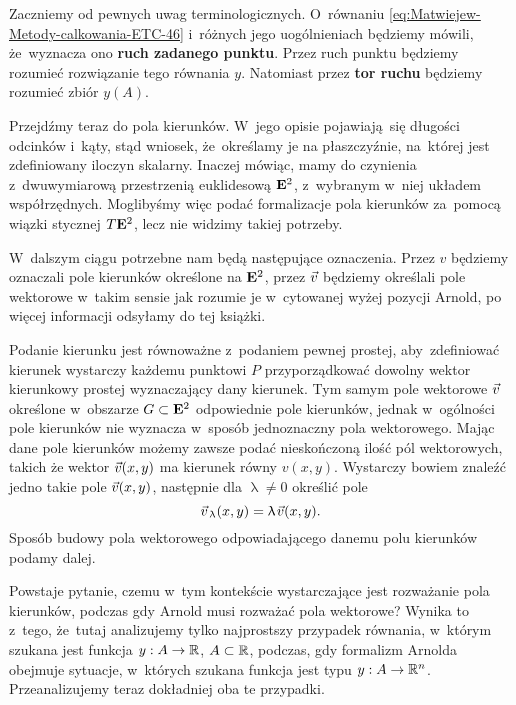 \documentclass[a4paper,11pt]{article}
\numberwithin{equation}{section}
\renewcommand{\lambda}{\uplambda}
\begin{document}
Zaczniemy od pewnych uwag terminologicznych. O~równaniu
\eqref{eq:Matwiejew-Metody-calkowania-ETC-46} i~różnych jego
uogólnieniach będziemy mówili, że~wyznacza ono
\textbf{ruch zadanego punktu}. Przez ruch punktu będziemy rozumieć
rozwiązanie tego równania $y$. Natomiast przez \textbf{tor ruchu} będziemy
rozumieć zbiór $y( A )$.

Przejdźmy teraz do pola kierunków. W~jego opisie pojawiają~się długości
odcinków i~kąty, stąd wniosek, że~określamy je na płaszczyźnie, na~której
jest zdefiniowany iloczyn skalarny. Inaczej mówiąc, mamy do czynienia
z~dwuwymiarową
przestrzenią euklidesową $\mathbf{E}^{ 2 }$, z~wybranym w~niej układem
współrzędnych. Moglibyśmy więc podać formalizacje pola kierunków za~pomocą
wiązki stycznej $T \mathbf{E}^{ 2 }$, lecz nie widzimy takiej potrzeby.

W~dalszym ciągu potrzebne nam będą następujące oznaczenia. Przez $v$
będziemy oznaczali pole kierunków określone na $\mathbf{E}^{ 2 }$, przez
$\vec{v}$ będziemy określali pole wektorowe w~takim sensie jak rozumie je
w~cytowanej wyżej pozycji Arnold, po więcej informacji odsyłamy do tej
książki.

Podanie kierunku jest równoważne z~podaniem pewnej prostej, aby~zdefiniować
kierunek wystarczy każdemu punktowi $P$ przyporządkować dowolny wektor
kierunkowy prostej wyznaczający dany kierunek. Tym samym pole wektorowe
$\vec{v}$ określone w~obszarze $G \subset \mathbf{E}^{ 2 }$ odpowiednie pole kierunków,
jednak w~ogólności pole kierunków nie wyznacza w~sposób jednoznaczny pola
wektorowego. Mając dane pole kierunków możemy zawsze podać nieskończoną
ilość pól wektorowych, takich że wektor $\vec{v}( x, y )$ ma kierunek równy
$v( x, y )$. Wystarczy bowiem znaleźć jedno takie pole $\vec{v}( x, y )$,
następnie dla $\lambda \neq 0$ określić pole
\begin{equation}
  \label{eq:Uwagi-do-konkrentych-stron-28}
  \vecv_{ \, \lambda }( x, y ) = \lambda \HorSpaceThree \vecv( x, y ).
\end{equation}
Sposób budowy pola wektorowego odpowiadającego danemu polu kierunków podamy
dalej.

Powstaje pytanie, czemu w~tym kontekście wystarczające jest rozważanie pola
kierunków, podczas gdy Arnold musi rozważać pola wektorowe? Wynika to
z~tego, że~tutaj analizujemy tylko najprostszy przypadek równania, w~którym
szukana jest funkcja $y : A \to \mathbb{R}$, $A \subset \mathbb{R}$, podczas, gdy formalizm
Arnolda obejmuje sytuacje, w~których szukana funkcja jest typu
$y : A \to \mathbb{R}^{ n }$. Przeanalizujemy teraz dokładniej oba te przypadki.
\end{document}

